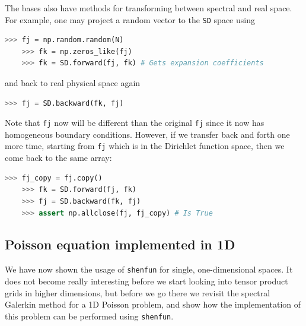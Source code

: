 \documentclass[%
oneside,                 %
final,                   %
10pt]{article}
\begin{document}
The bases also have methods for transforming between spectral and real space. For example, one may project a random vector to the \texttt{SD} space using
\begin{lstlisting}[language=Python,style=yellow2_fb]
    >>> fj = np.random.random(N)
    >>> fk = np.zeros_like(fj)
    >>> fk = SD.forward(fj, fk) # Gets expansion coefficients 
\end{lstlisting}
and back to real physical space again
\begin{lstlisting}[language=Python,style=yellow2_fb]
    >>> fj = SD.backward(fk, fj)
\end{lstlisting}
Note that \texttt{fj} now will be different than the original \texttt{fj} since it now has homogeneous boundary conditions. However, if we transfer back and forth one more time, starting from \texttt{fj} which is in the Dirichlet function space, then we come back to the same array:
\begin{lstlisting}[language=Python,style=yellow2_fb]
    >>> fj_copy = fj.copy()
    >>> fk = SD.forward(fj, fk)
    >>> fj = SD.backward(fk, fj)
    >>> assert np.allclose(fj, fj_copy) # Is True
\end{lstlisting}

\subsection{Poisson equation implemented in 1D}

We have now shown the usage of \texttt{shenfun} for single, one-dimensional spaces. It does not become really interesting before we start looking into tensor product grids in higher dimensions, but before we go there we revisit the spectral Galerkin method for a 1D Poisson problem, and show how the implementation of this problem can be performed using \texttt{shenfun}.
\end{document}

